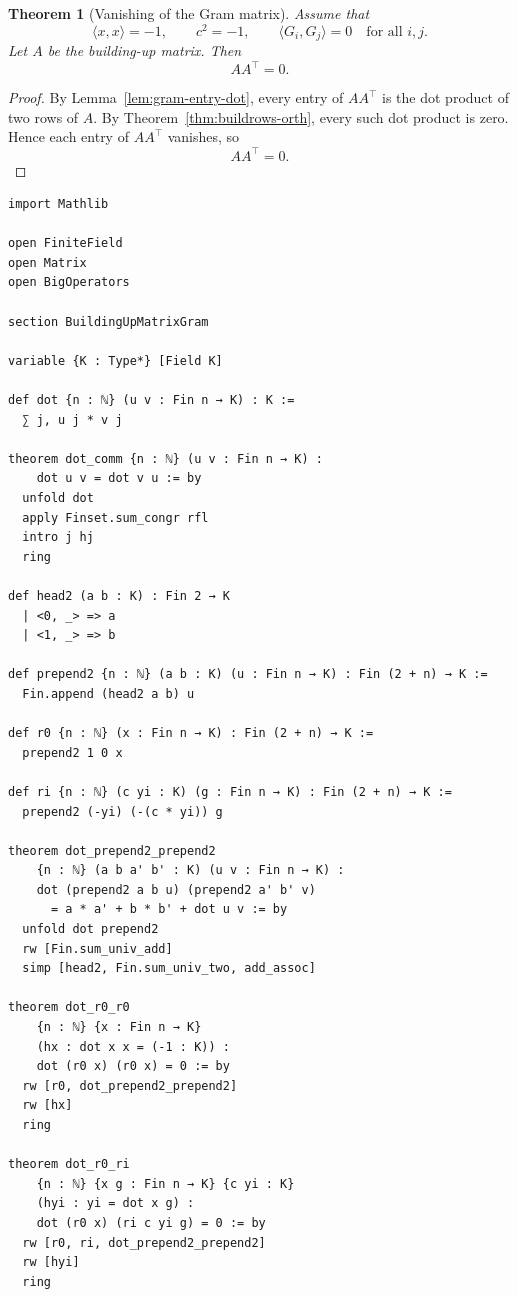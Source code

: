 \documentclass[12pt]{article}
\newtheorem{theorem}{Theorem}[section]
\begin{document}
\begin{theorem}[Vanishing of the Gram matrix]
\label{thm:gram-zero}
Assume that
\[
\langle x,x\rangle=-1,
\qquad
c^2=-1,
\qquad
\langle G_i,G_j\rangle=0 \quad \text{for all } i,j.
\]
Let $A$ be the building-up matrix. Then
\[
AA^\top = 0.
\]
\end{theorem}

\begin{proof}
By Lemma~\ref{lem:gram-entry-dot}, every entry of $AA^\top$ is the dot product of two rows of $A$. By Theorem~\ref{thm:buildrows-orth}, every such dot product is zero. Hence each entry of $AA^\top$ vanishes, so
\[
AA^\top = 0.
\]

\end{proof}

\begin{lstlisting}[caption={Lean verification for Theorem~\ref{thm:gram-zero}.}]
import Mathlib

open FiniteField
open Matrix
open BigOperators

section BuildingUpMatrixGram

variable {K : Type*} [Field K]

def dot {n : ℕ} (u v : Fin n → K) : K :=
  ∑ j, u j * v j

theorem dot_comm {n : ℕ} (u v : Fin n → K) :
    dot u v = dot v u := by
  unfold dot
  apply Finset.sum_congr rfl
  intro j hj
  ring

def head2 (a b : K) : Fin 2 → K
  | <0, _> => a
  | <1, _> => b

def prepend2 {n : ℕ} (a b : K) (u : Fin n → K) : Fin (2 + n) → K :=
  Fin.append (head2 a b) u

def r0 {n : ℕ} (x : Fin n → K) : Fin (2 + n) → K :=
  prepend2 1 0 x

def ri {n : ℕ} (c yi : K) (g : Fin n → K) : Fin (2 + n) → K :=
  prepend2 (-yi) (-(c * yi)) g

theorem dot_prepend2_prepend2
    {n : ℕ} (a b a' b' : K) (u v : Fin n → K) :
    dot (prepend2 a b u) (prepend2 a' b' v)
      = a * a' + b * b' + dot u v := by
  unfold dot prepend2
  rw [Fin.sum_univ_add]
  simp [head2, Fin.sum_univ_two, add_assoc]

theorem dot_r0_r0
    {n : ℕ} {x : Fin n → K}
    (hx : dot x x = (-1 : K)) :
    dot (r0 x) (r0 x) = 0 := by
  rw [r0, dot_prepend2_prepend2]
  rw [hx]
  ring

theorem dot_r0_ri
    {n : ℕ} {x g : Fin n → K} {c yi : K}
    (hyi : yi = dot x g) :
    dot (r0 x) (ri c yi g) = 0 := by
  rw [r0, ri, dot_prepend2_prepend2]
  rw [hyi]
  ring


\end{lstlisting}
\end{document}
